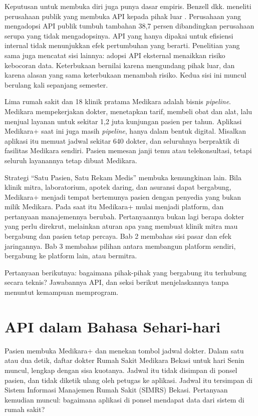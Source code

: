 Keputusan untuk membuka diri juga punya dasar empiris. Benzell dkk. meneliti
perusahaan publik yang membuka API kepada pihak luar \cite{benzell2024apis}.
Perusahaan yang mengadopsi API publik tumbuh tambahan 38,7 persen dibandingkan
perusahaan serupa yang tidak mengadopsinya. API yang hanya dipakai untuk
efisiensi internal tidak menunjukkan efek pertumbuhan yang berarti. Penelitian
yang sama juga mencatat sisi lainnya: adopsi API eksternal menaikkan risiko
kebocoran data. Keterbukaan bernilai karena mengundang pihak luar, dan karena
alasan yang sama keterbukaan menambah risiko. Kedua sisi ini muncul berulang kali
sepanjang semester.

\begin{kasus}[title={Kasus Medikara Health: Rumah Sakit sebagai Pipeline, Medikara+ sebagai Calon Platform}]
Lima rumah sakit dan 18 klinik pratama Medikara adalah bisnis \textit{pipeline}.
Medikara mempekerjakan dokter, menetapkan tarif, membeli obat dan alat, lalu
menjual layanan untuk sekitar 1,2 juta kunjungan pasien per tahun. Aplikasi
Medikara+ saat ini juga masih \textit{pipeline}, hanya dalam bentuk digital.
Misalkan aplikasi itu memuat jadwal sekitar 640 dokter, dan seluruhnya berpraktik
di fasilitas Medikara sendiri. Pasien memesan janji temu atau telekonsultasi,
tetapi seluruh layanannya tetap dibuat Medikara.

Strategi ``Satu Pasien, Satu Rekam Medis'' membuka kemungkinan lain. Bila klinik
mitra, laboratorium, apotek daring, dan asuransi dapat bergabung, Medikara+
menjadi tempat bertemunya pasien dengan penyedia yang bukan milik Medikara. Pada
saat itu Medikara+ mulai menjadi platform, dan pertanyaan manajemennya berubah.
Pertanyaannya bukan lagi berapa dokter yang perlu direkrut, melainkan aturan apa
yang membuat klinik mitra mau bergabung dan pasien tetap percaya. Bab 2 membahas
sisi pasar dan efek jaringannya. Bab 3 membahas pilihan antara membangun platform
sendiri, bergabung ke platform lain, atau bermitra.
\end{kasus}

Pertanyaan berikutnya: bagaimana pihak-pihak yang bergabung itu terhubung secara
teknis? Jawabannya API, dan seksi berikut menjelaskannya tanpa menuntut
kemampuan memprogram.

\section{API dalam Bahasa Sehari-hari}

Pasien membuka Medikara+ dan menekan tombol jadwal dokter. Dalam satu atau dua
detik, daftar dokter Rumah Sakit Medikara Bekasi untuk hari Senin muncul, lengkap
dengan sisa kuotanya. Jadwal itu tidak disimpan di ponsel pasien, dan tidak
diketik ulang oleh petugas ke aplikasi. Jadwal itu tersimpan di Sistem Informasi
Manajemen Rumah Sakit (SIMRS) Bekasi. Pertanyaan kemudian muncul: bagaimana
aplikasi di ponsel mendapat data dari sistem di rumah sakit?

